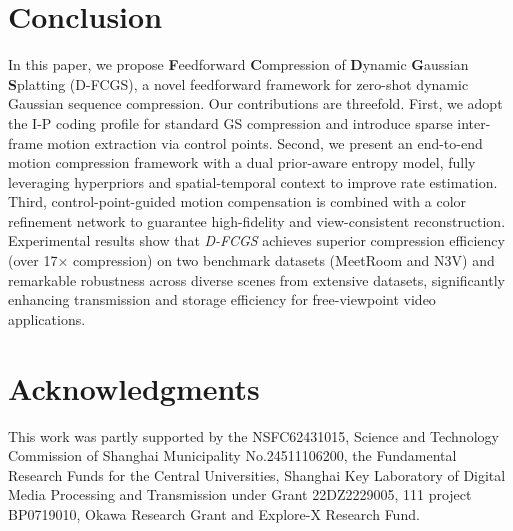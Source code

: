 \documentclass[letterpaper]{article} %
\begin{document}
\section{Conclusion}


In this paper, we propose \textbf{F}eedforward \textbf{C}ompression of \textbf{D}ynamic \textbf{G}aussian \textbf{S}platting (D-FCGS), a novel feedforward framework for zero-shot dynamic Gaussian sequence compression. 
%
Our contributions are threefold. 
%
First, we adopt the I-P coding profile for standard GS compression and introduce sparse inter-frame motion extraction via control points. 
%
Second, we present an end-to-end motion compression framework with a dual prior-aware entropy model, fully leveraging hyperpriors and spatial-temporal context to improve rate estimation. 
%
Third, control-point-guided motion compensation is combined with a color refinement network to guarantee high-fidelity and view-consistent reconstruction. 
%
Experimental results show that \emph{D-FCGS} achieves superior compression efficiency (over 17× compression) on two benchmark datasets (MeetRoom and N3V) and remarkable robustness across diverse scenes from extensive datasets, significantly enhancing transmission and storage efficiency for free-viewpoint video applications.



\section*{Acknowledgments}
This work was partly supported by the NSFC62431015, Science and Technology Commission of Shanghai Municipality No.24511106200, the Fundamental Research Funds for the Central Universities, Shanghai Key Laboratory of Digital Media Processing and Transmission under Grant 22DZ2229005, 111 project BP0719010, Okawa Research Grant and Explore-X Research Fund.


\end{document}

